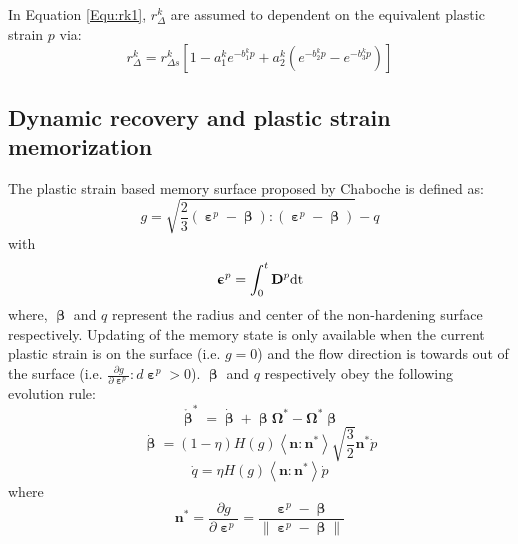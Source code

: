 In Equation \ref{Equ:rk1}, $r_\Delta ^k$ are assumed to dependent on the equivalent plastic strain $p$ via:
\begin{equation}
\label{Equ:rdeltak1}
r_\Delta ^k = r_{\Delta s}^k\left[ {1 - a_1^k{e^{ - b_1^kp}} + a_2^k({e^{ - b_2^kp}} - {e^{ - b_3^kp}})} \right]
\end{equation}

\subsection{Dynamic recovery and plastic strain memorization}
The plastic strain based memory surface proposed by Chaboche is defined as:
\begin{equation}
\label{Equ:g1}
g = \sqrt {\frac{2}{3}\left( {{{\bm{\upepsilon }}^p} - {\bm{\upbeta}}} \right):\left( {{{\bm{\upepsilon }}^p} - {\bm{\upbeta}}} \right)}  - q
\end{equation}
with
\begin{equation}
{{\bm{\upepsilon }}^p}=\int_0^t{{\mathbf{D}}^p \rm{dt}}
\end{equation}
where, $\bm{\upbeta}$ and $q$ represent the radius and center of the non-hardening surface respectively.
Updating of the memory state is only available when the current plastic strain is on the surface (i.e. $g=0$) and the flow direction is towards out of the surface (i.e. $\frac{{\partial g}}{{\partial {{\bm{\upepsilon }}^p}}}:d{{\bm{\upepsilon }}^p} > 0$). $\bm{\upbeta}$ and $q$ respectively obey the following evolution rule:
\begin{equation}
{\mathring {\bm{\upbeta }}^{*}} = \dot {\bm{\upbeta }}  + \bm{\upbeta } {{\mathbf{\Omega }}^*} - {{\mathbf{\Omega }}^*}\bm{\upbeta }
\end{equation}
\begin{equation}
\label{Equ:dotbeta1}
\dot{\bm{\upbeta}}  = \left( {1 - \eta } \right)H\left( g \right)\left\langle {{\mathbf{n}}:{{\mathbf{n}}^*}} \right\rangle \sqrt {\frac{3}{2}} {{\mathbf{n}}^*}\dot p
\end{equation}
\begin{equation}
\label{Equ:dotq1}
\dot q = \eta H\left( g \right)\left\langle {{\mathbf{n}}:{{\mathbf{n}}^*}} \right\rangle \dot p
\end{equation}
where
\begin{equation}
\label{Equ:nstar}
{{\mathbf{n}}^*} = \frac{{\partial g}}{{\partial {{\bm{\upepsilon }}^p}}} = \frac{{{{\bm{\upepsilon }}^p} - {\bm{\upbeta}}}}{{\left\| {{{\bm{\upepsilon }}^p} - {\bm{\upbeta}}} \right\|}}
\end{equation}

